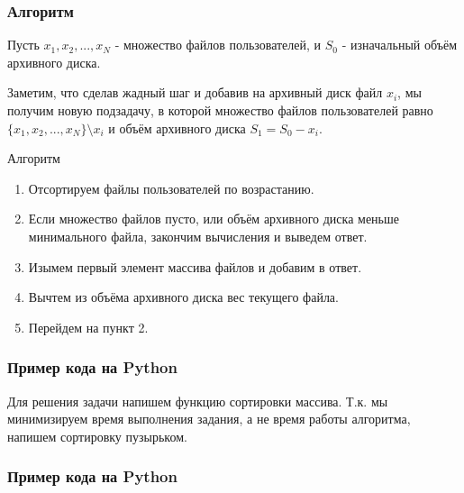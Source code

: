 \documentclass{beamer}
\begin{document}
\begin{frame}

    \frametitle{Алгоритм}

    Пусть $x_1, x_2, ... , x_N$ - множество файлов пользователей, и $S_0$ - изначальный объём архивного диска.

    Заметим, что сделав жадный шаг и добавив на архивный диск файл $x_i$, мы получим новую подзадачу, в которой множество файлов пользователей равно $\{x_1, x_2, ... , x_N\} \setminus x_i$ и объём архивного диска $S_1 = S_0 - x_i$. 

    \pause

    \begin{alertblock}{Алгоритм}

        {\footnotesize

        \begin{enumerate}

            \item Отсортируем файлы пользователей по возрастанию.

            \item Если множество файлов пусто, или объём архивного диска меньше минимального файла, закончим вычисления и выведем ответ.

            \item Изымем первый элемент массива файлов и добавим в ответ.

            \item Вычтем из объёма архивного диска вес текущего файла.

            \item Перейдем на пункт 2.

        \end{enumerate}
        
        }

    \end{alertblock}

\end{frame}

\begin{frame}[fragile]

    \frametitle{Пример кода на Python}

    Для решения задачи напишем функцию сортировки массива. Т.к. мы минимизируем время выполнения задания, а не время работы алгоритма, напишем сортировку пузырьком.

    

\end{frame}

\begin{frame}

    \frametitle{Пример кода на Python}
\end{frame}
\end{document}
